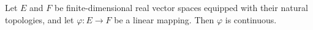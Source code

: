 Let $E$ and $F$ be finite-dimensional real vector spaces equipped with their natural topologies, and let $\varphi: E \to F$ be a linear mapping. Then $\varphi$ is continuous.
